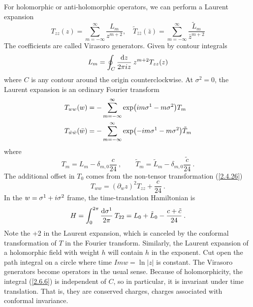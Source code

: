 For holomorphic or anti-holomorphic operators, we can perform a Laurent expansion    
\begin{equation}
	T_{z z}(z)=\sum_{m=-\infty}^{\infty} \frac{L_{m}}{z^{m+2}}, \quad \tilde{T}_{\bar{z} \bar{z}}(\bar{z})=\sum_{m=-\infty}^{\infty} \frac{\tilde{L}_{m}}{\bar{z}^{m+2}} \label{2.6.5}
\end{equation}
The coefficients are called Virasoro generators.    
Given by contour integrals    
\begin{equation}\label{2.6.6}
	L_{m}=\oint_{C} \frac{\mathrm{d} z}{2 \pi i z} \: z^{m+2} T_{z z}(z)
\end{equation}
where $C$ is any contour around the origin counterclockwise.    
At $\sigma^2=0$, the Laurent expansion is an ordinary Fourier transform    
\begin{subequations} \label{2.6.7}
	\begin{align}
		T_{w w}(w)&=-\sum_{m=-\infty}^{\infty} \exp (i m \sigma^{1}-m \sigma^{2}) T_{m}   \label{2.6.7a}\\
		T_{\bar{w} \bar{w}}(\bar{w})&=-\sum_{m=-\infty}^{\infty} \exp (-i m \sigma^{1}-m \sigma^{2}) \tilde{T}_{m} \label{2.6.7b}
	\end{align}
\end{subequations}
where    
\begin{equation}\label{2.6.8}
	T_{m}=L_{m}-\delta_{m, 0} \frac{c}{24} \:, \qquad \tilde{T}_{m}=\tilde{L}_{m}-\delta_{m, 0} \frac{\tilde{c}}{24} \:.
\end{equation}
The additional offset in $T_0$ comes from the non-tensor transformation (\ref{2.4.26})    
\begin{equation}
	T_{w w}=(\partial_{w} z)^{2} T_{z z}+\frac{c}{24} \:.
\end{equation}
In the $w=\sigma^{1}+i \sigma^{2}$ frame, the time-translation Hamiltonian is    
\begin{equation}\label{2.6.10}
	H= \int_{0}^{2 \pi} \frac{\mathrm{d} \sigma^{1}}{2 \pi} \: T_{22}=L_{0}+\tilde{L}_{0}-\frac{c+\tilde{c}}{24} \:.
\end{equation}
Note the +2 in the Laurent expansion, which is canceled by the conformal transformation of $T$ in the Fourier transform. Similarly, the Laurent expansion of a holomorphic field with weight $h$ will contain $h$ in the exponent.    
Cut open the path integral on a circle where time $Im{w}=\ln |z|$ is constant. The Virasoro generators become operators in the usual sense. Because of holomorphicity, the integral (\ref{2.6.6}) is independent of $C$, so in particular, it is invariant under time translation. That is, they are conserved charges, charges associated with conformal invariance.    

